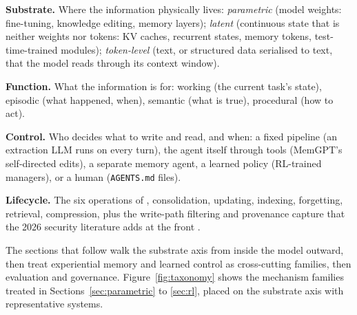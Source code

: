 \documentclass[11pt]{article}
\begin{document}
\textbf{Substrate.} Where the information physically lives: \emph{parametric} (model weights: fine-tuning, knowledge editing, memory layers); \emph{latent} (continuous state that is neither weights nor tokens: KV caches, recurrent states, memory tokens, test-time-trained modules); \emph{token-level} (text, or structured data serialised to text, that the model reads through its context window).

\textbf{Function.} What the information is for: working (the current task's state), episodic (what happened, when), semantic (what is true), procedural (how to act).

\textbf{Control.} Who decides what to write and read, and when: a fixed pipeline (an extraction LLM runs on every turn), the agent itself through tools (MemGPT's self-directed edits), a separate memory agent, a learned policy (RL-trained managers), or a human (\texttt{AGENTS.md} files).

\textbf{Lifecycle.} The six operations of \citet{du2025rethinking}, consolidation, updating, indexing, forgetting, retrieval, compression, plus the write-path filtering and provenance capture that the 2026 security literature adds at the front \citep{lin2026security}.

The sections that follow walk the substrate axis from inside the model outward, then treat experiential memory and learned control as cross-cutting families, then evaluation and governance.
Figure~\ref{fig:taxonomy} shows the mechanism families treated in Sections~\ref{sec:parametric} to \ref{sec:rl}, placed on the substrate axis with representative systems.
\end{document}
